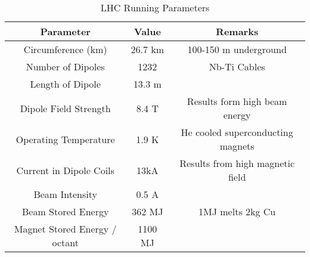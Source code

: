 \begin{center}
\begin{table}[]
\begin{center}
\caption{LHC Running Parameters \cite{lhcparams}}
\begin{tabular}{ccc}
\textbf{Parameter} & \textbf{Value} & \textbf{Remarks} \\
\hline
Circumference (km) & 26.7 km & 100-150 m underground\\
Number of Dipoles & 1232 & Nb-Ti Cables \\
Length of Dipole & 13.3 m & \\
Dipole Field Strength & 8.4 T & Results form high beam energy \\
Operating Temperature & 1.9 K & He cooled superconducting magnets\\
Current in Dipole Coils & 13kA & Results from high magnetic field \\
Beam Intensity & 0.5 A & \\ 
Beam Stored Energy & 362 MJ & 1MJ melts 2kg Cu \\
Magnet Stored Energy / octant & 1100 MJ & \\
\end{tabular}
\end{center}
\end{table}
\end{center}
